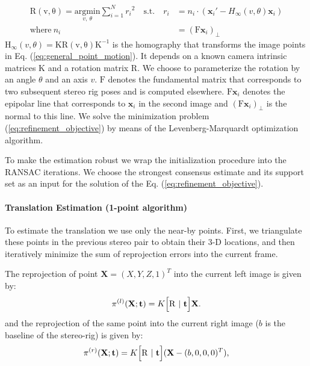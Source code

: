 \begin{equation}\label{eq:refinement_objective}
  \begin{split}
    \mathrm{R(v,\theta)} = \underset{v,\ \theta}{\mathrm{argmin}}
    \sum_{i=1}^N{r_i}^2\quad \text{s.t.}\quad r_i&=n_i\cdot (\mathbf{x}_i'-H_\infty(v,\theta)\mathbf{x}_i) \\
    \text{where}\ n_i &= (\mathrm{F}\mathbf{x}_i)_\perp
  \end{split}
\end{equation}
$\mathrm{H_\infty}(v,\theta) = \mathrm{KR(v,\theta)K^{-1}}$ is the
homography that transforms the image points in Eq.
(\ref{eq:general_point_motion}). It depends on a known camera
intrinsic matrices $\mathrm{K}$ and a rotation matrix $\mathrm{R}$.
We choose to parameterize the rotation by an angle $\theta$ and an
axis $v$.  $\mathrm{F}$ denotes the fundamental matrix that
corresponds to two subsequent stereo rig poses and is computed
elsewhere. $\mathrm{F}\mathbf{x}_i$ denotes the epipolar line that
corresponds to $\mathbf{x}_i$ in the second image and
$(\mathrm{F}\mathbf{x}_i)_\perp$ is the normal to this line.
We solve the minimization problem
(\ref{eq:refinement_objective}) by means of the Levenberg-Marquardt
optimization algorithm.

To make the estimation robust we wrap the initialization procedure
into the RANSAC iterations.  We choose the strongest consensus
estimate and its support set as an input for the solution of the
Eq. (\ref{eq:refinement_objective}).

\paragraph{Translation Estimation (1-point
  algorithm)}\label{sec:stereo_trans} To estimate
the translation we use only the near-by points.  First, we triangulate
these points in the previous stereo pair to obtain their 3-D
locations, and then iteratively minimize the sum of reprojection
errors into the current frame.

The reprojection of point $\mathbf{X}=(X,Y,Z,1)^T$ into the current
left image is given by:
\begin{equation}
  \pi^{(l)}(\mathbf{X};\mathbf{t}) =  K\Bigl[ \mathrm{R}\ |\ \mathbf{t} \Bigr]\mathbf{X}.
\end{equation}
and the reprojection of the same point into the current right image
($b$ is the baseline of the stereo-rig) is given by:
\begin{equation}
  \pi^{(r)}(\mathbf{X};\mathbf{t}) =  K\Bigl[ \mathrm{R}\ |\ \mathbf{t} \Bigr](\mathbf{X} - (b,0,0,0)^T),
\end{equation}

